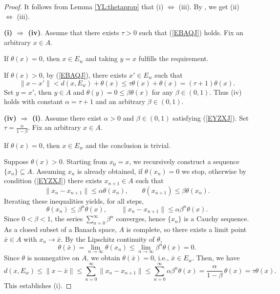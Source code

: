 \documentclass[11pt]{article}
\begin{document}
\begin{proof}
It follows from Lemma \ref{YL:thetaprop}     that  (i) $\Leftrightarrow$ (iii).
		By \cite[Theorem 4]{LiuNgYang2009},  we get    (ii) $\Leftrightarrow$ (iii).
	
 
	\noindent\textbf{(i) $\Rightarrow$ (iv)}.
  Assume  that   there exists $\tau>0$ such that  (\ref{EBAQJ}) holds.   
  Fix an arbitrary \(x \in A\). 
  
  If \(\theta(x) = 0\), then \(x \in E_w\) and taking \(y = x\) fulfills the requirement.
  
  If \(\theta(x) > 0\),  by   (\ref{EBAQJ}),     there exists \(x' \in E_w\) such that
  \[
  \|x - x'\| < d(x,E_w) + \theta(x) \le \tau\theta(x) + \theta(x) = (\tau+1)\theta(x).
  \]
  Set \(y = x'\),   then \(y \in A\) and \(\theta(y) = 0 \le \beta\theta(x)\) for any \(\beta \in (0,1)\). Thus (iv) holds with constant \(\alpha = \tau+1\) and an arbitrary \(\beta \in (0,1)\).
  
  
  
  	\noindent\textbf{(iv) $\Rightarrow$ (i)}.
  Assume there exist \(\alpha>0\) and \(\beta \in (0,1)\) satisfying  (\ref{EYZXJ}). Set \(\tau = \frac{\alpha}{1-\beta}\).
    Fix an arbitrary \(x \in A\). 
    
      If \(\theta(x)=0\), then \(x \in E_w\) and the conclusion is trivial. 
      
      Suppose \(\theta(x) > 0\). Starting from \(x_0 = x\), we recursively construct a sequence \(\{x_n\} \subseteq A\). 
  Assuming \(x_n\) is already obtained, if \(\theta(x_n) = 0\) we stop,  otherwise by condition (\ref{EYZXJ}) there exists \(x_{n+1} \in A\) such that
  \[
  \|x_n - x_{n+1}\| \le \alpha \theta(x_n), \qquad \theta(x_{n+1}) \le \beta \theta(x_n).
  \]
  Iterating these inequalities yields, for all steps,
  \[
  \theta(x_n) \le \beta^n \theta(x), \qquad \|x_n - x_{n+1}\| \le \alpha \beta^n \theta(x).
  \]
  Since \(0 < \beta < 1\), the series \(\sum_{n=0}^\infty \beta^n\) converges, hence \(\{x_n\}\) is a Cauchy sequence. As a closed subset of a Banach space, \(A\) is complete, so there exists a limit point \(\bar{x} \in A\) with \(x_n \to \bar{x}\). 
  By the Lipschitz continuity of \(\theta\),
  \[
  \theta(\bar{x}) = \lim_{n\to\infty} \theta(x_n) \le \lim_{n\to\infty} \beta^n \theta(x) = 0.
  \]
  Since \(\theta\) is nonnegative on \(A\), we obtain \(\theta(\bar{x}) = 0\), i.e., \(\bar{x} \in E_w\).   Then, we have
  \[ d(x,E_w) \le
  \|x - \bar{x}\| \le \sum_{n=0}^{\infty} \|x_n - x_{n+1}\|
  \le \sum_{n=0}^{\infty} \alpha \beta^n \theta(x)
  = \frac{\alpha}{1-\beta}\,\theta(x) = \tau \theta(x).
  \]
  This establishes (i).



\end{proof}
\end{document}

